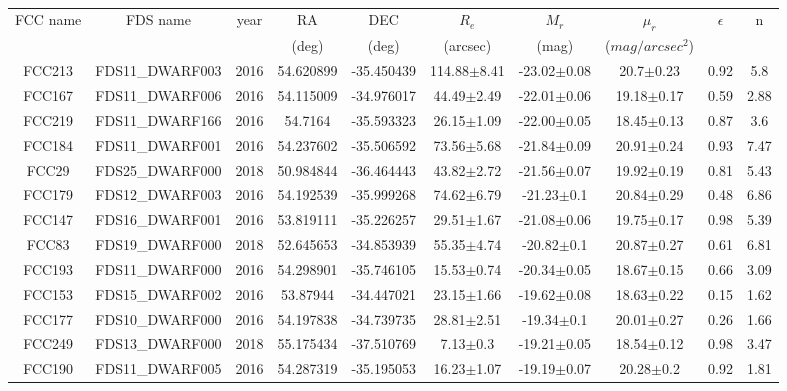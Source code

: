 \documentclass{aa}
\begin{document}
\begin{table}
\begin{center}
\caption{}
{\renewcommand{\arraystretch}{1.}
\resizebox{18cm}{!} {
\begin{tabular}{|cccccccccc|}
\hline 
FCC name & FDS name & year & RA & DEC & $R_e$ & $M_r$ & $\mu_r$  & $\epsilon$ & n \\ 
 &  &  & (deg) & (deg) & (arcsec) & (mag) & ($mag/arcsec^2$) &  & \\
\hline \hline
FCC213 & FDS11\_DWARF003 & 2016 & 54.620899 & -35.450439 & 114.88$\pm$8.41 & -23.02$\pm$0.08 & 20.7$\pm$0.23 & 0.92 & 5.8 \\
FCC167 & FDS11\_DWARF006 & 2016 & 54.115009 & -34.976017 & 44.49$\pm$2.49 & -22.01$\pm$0.06 & 19.18$\pm$0.17 & 0.59 & 2.88 \\
FCC219 & FDS11\_DWARF166 & 2016 & 54.7164 & -35.593323 & 26.15$\pm$1.09 & -22.00$\pm$0.05 & 18.45$\pm$0.13 & 0.87 & 3.6 \\
FCC184 & FDS11\_DWARF001 & 2016 & 54.237602 & -35.506592 & 73.56$\pm$5.68 & -21.84$\pm$0.09 & 20.91$\pm$0.24 & 0.93 & 7.47 \\
FCC29 & FDS25\_DWARF000 & 2018 & 50.984844 & -36.464443 & 43.82$\pm$2.72 & -21.56$\pm$0.07 & 19.92$\pm$0.19 & 0.81 & 5.43 \\
FCC179 & FDS12\_DWARF003 & 2016 & 54.192539 & -35.999268 & 74.62$\pm$6.79 & -21.23$\pm$0.1 & 20.84$\pm$0.29 & 0.48 & 6.86 \\
FCC147 & FDS16\_DWARF001 & 2016 & 53.819111 & -35.226257 & 29.51$\pm$1.67 & -21.08$\pm$0.06 & 19.75$\pm$0.17 & 0.98 & 5.39 \\
FCC83 & FDS19\_DWARF000 & 2018 & 52.645653 & -34.853939 & 55.35$\pm$4.74 & -20.82$\pm$0.1 & 20.87$\pm$0.27 & 0.61 & 6.81 \\
FCC193 & FDS11\_DWARF000 & 2016 & 54.298901 & -35.746105 & 15.53$\pm$0.74 & -20.34$\pm$0.05 & 18.67$\pm$0.15 & 0.66 & 3.09 \\
FCC153 & FDS15\_DWARF002 & 2016 & 53.87944 & -34.447021 & 23.15$\pm$1.66 & -19.62$\pm$0.08 & 18.63$\pm$0.22 & 0.15 & 1.62 \\
FCC177 & FDS10\_DWARF000 & 2016 & 54.197838 & -34.739735 & 28.81$\pm$2.51 & -19.34$\pm$0.1 & 20.01$\pm$0.27 & 0.26 & 1.66 \\
FCC249 & FDS13\_DWARF000 & 2018 & 55.175434 & -37.510769 & 7.13$\pm$0.3 & -19.21$\pm$0.05 & 18.54$\pm$0.12 & 0.98 & 3.47 \\
FCC190 & FDS11\_DWARF005 & 2016 & 54.287319 & -35.195053 & 16.23$\pm$1.07 & -19.19$\pm$0.07 & 20.28$\pm$0.2 & 0.92 & 1.81 \\

\end{tabular}}}
\end{center}
\end{table}
\end{document}
